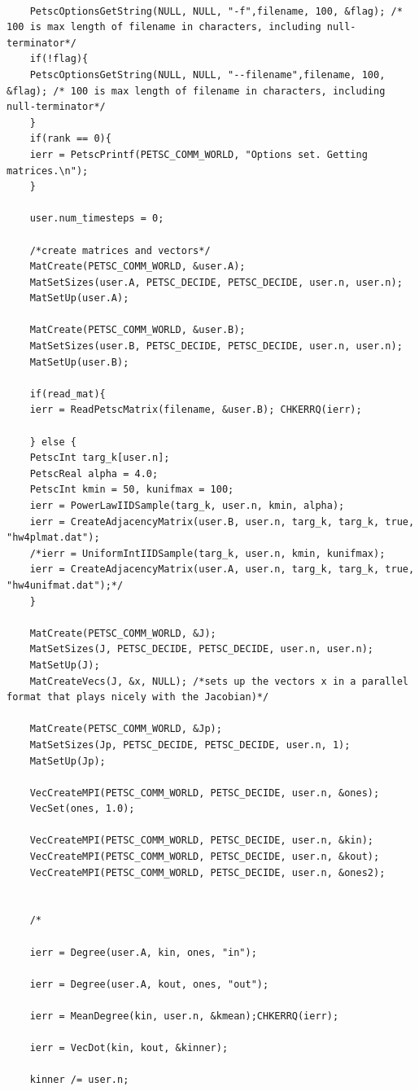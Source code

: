 \documentclass[]{article}
\begin{document}
\begin{Verbatim}[xleftmargin=-5cm]
	
	PetscOptionsGetString(NULL, NULL, "-f",filename, 100, &flag); /* 100 is max length of filename in characters, including null-terminator*/
	if(!flag){
	PetscOptionsGetString(NULL, NULL, "--filename",filename, 100, &flag); /* 100 is max length of filename in characters, including null-terminator*/
	}
	if(rank == 0){
	ierr = PetscPrintf(PETSC_COMM_WORLD, "Options set. Getting matrices.\n");
	}
	
	user.num_timesteps = 0;
	
	/*create matrices and vectors*/
	MatCreate(PETSC_COMM_WORLD, &user.A);
	MatSetSizes(user.A, PETSC_DECIDE, PETSC_DECIDE, user.n, user.n);
	MatSetUp(user.A);
	
	MatCreate(PETSC_COMM_WORLD, &user.B);
	MatSetSizes(user.B, PETSC_DECIDE, PETSC_DECIDE, user.n, user.n);
	MatSetUp(user.B);
	
	if(read_mat){
	ierr = ReadPetscMatrix(filename, &user.B); CHKERRQ(ierr);
	
	} else {
	PetscInt targ_k[user.n];
	PetscReal alpha = 4.0;
	PetscInt kmin = 50, kunifmax = 100;
	ierr = PowerLawIIDSample(targ_k, user.n, kmin, alpha);
	ierr = CreateAdjacencyMatrix(user.B, user.n, targ_k, targ_k, true, "hw4plmat.dat");
	/*ierr = UniformIntIIDSample(targ_k, user.n, kmin, kunifmax);
	ierr = CreateAdjacencyMatrix(user.A, user.n, targ_k, targ_k, true, "hw4unifmat.dat");*/
	}
	
	MatCreate(PETSC_COMM_WORLD, &J);
	MatSetSizes(J, PETSC_DECIDE, PETSC_DECIDE, user.n, user.n);
	MatSetUp(J);
	MatCreateVecs(J, &x, NULL); /*sets up the vectors x in a parallel format that plays nicely with the Jacobian)*/
	
	MatCreate(PETSC_COMM_WORLD, &Jp);
	MatSetSizes(Jp, PETSC_DECIDE, PETSC_DECIDE, user.n, 1);
	MatSetUp(Jp);
	
	VecCreateMPI(PETSC_COMM_WORLD, PETSC_DECIDE, user.n, &ones);
	VecSet(ones, 1.0);
	
	VecCreateMPI(PETSC_COMM_WORLD, PETSC_DECIDE, user.n, &kin);
	VecCreateMPI(PETSC_COMM_WORLD, PETSC_DECIDE, user.n, &kout);
	VecCreateMPI(PETSC_COMM_WORLD, PETSC_DECIDE, user.n, &ones2);
	
	
	/*
	
	ierr = Degree(user.A, kin, ones, "in");
	
	ierr = Degree(user.A, kout, ones, "out");
	
	ierr = MeanDegree(kin, user.n, &kmean);CHKERRQ(ierr);
	
	ierr = VecDot(kin, kout, &kinner);
	
	kinner /= user.n;
	

\end{Verbatim}
\end{document}
